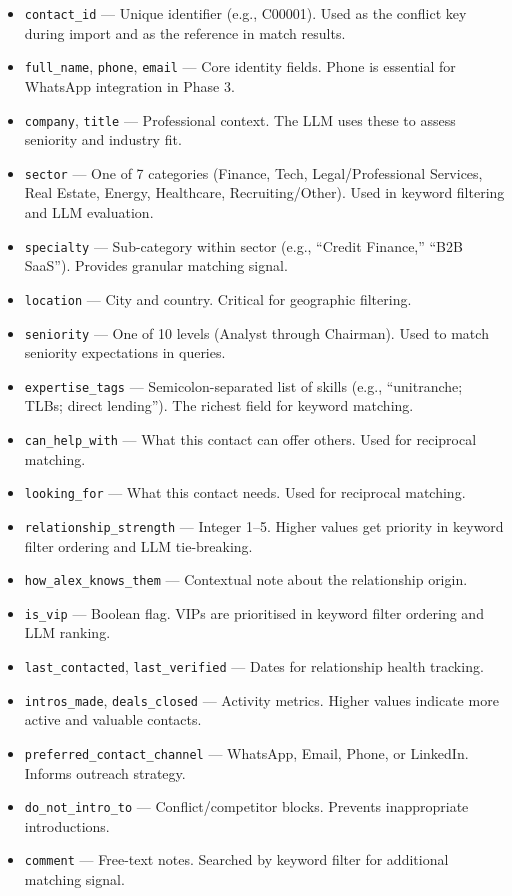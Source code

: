\documentclass[12pt, a4paper]{report}
\begin{document}
\begin{itemize}[itemsep=3pt]
    \item \texttt{contact\_id} --- Unique identifier (e.g., C00001). Used as the conflict key during import and as the reference in match results.
    \item \texttt{full\_name}, \texttt{phone}, \texttt{email} --- Core identity fields. Phone is essential for WhatsApp integration in Phase 3.
    \item \texttt{company}, \texttt{title} --- Professional context. The LLM uses these to assess seniority and industry fit.
    \item \texttt{sector} --- One of 7 categories (Finance, Tech, Legal/Professional Services, Real Estate, Energy, Healthcare, Recruiting/Other). Used in keyword filtering and LLM evaluation.
    \item \texttt{specialty} --- Sub-category within sector (e.g., ``Credit Finance,'' ``B2B SaaS''). Provides granular matching signal.
    \item \texttt{location} --- City and country. Critical for geographic filtering.
    \item \texttt{seniority} --- One of 10 levels (Analyst through Chairman). Used to match seniority expectations in queries.
    \item \texttt{expertise\_tags} --- Semicolon-separated list of skills (e.g., ``unitranche; TLBs; direct lending''). The richest field for keyword matching.
    \item \texttt{can\_help\_with} --- What this contact can offer others. Used for reciprocal matching.
    \item \texttt{looking\_for} --- What this contact needs. Used for reciprocal matching.
    \item \texttt{relationship\_strength} --- Integer 1--5. Higher values get priority in keyword filter ordering and LLM tie-breaking.
    \item \texttt{how\_alex\_knows\_them} --- Contextual note about the relationship origin.
    \item \texttt{is\_vip} --- Boolean flag. VIPs are prioritised in keyword filter ordering and LLM ranking.
    \item \texttt{last\_contacted}, \texttt{last\_verified} --- Dates for relationship health tracking.
    \item \texttt{intros\_made}, \texttt{deals\_closed} --- Activity metrics. Higher values indicate more active and valuable contacts.
    \item \texttt{preferred\_contact\_channel} --- WhatsApp, Email, Phone, or LinkedIn. Informs outreach strategy.
    \item \texttt{do\_not\_intro\_to} --- Conflict/competitor blocks. Prevents inappropriate introductions.
    \item \texttt{comment} --- Free-text notes. Searched by keyword filter for additional matching signal.
\end{itemize}
\end{document}
